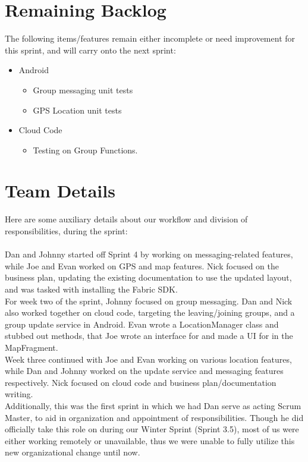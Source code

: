 \documentclass[11pt]{article}
\begin{document}
\section*{Remaining Backlog}
The following items/features remain either incomplete or need improvement for this sprint, and will carry onto the next sprint:
	\begin{itemize}
		\item Android
		\begin{itemize}
			\item Group messaging unit tests
			\item GPS Location unit tests
		\end{itemize}
		\item Cloud Code
		\begin{itemize}
			\item Testing on Group Functions.
		\end{itemize}
	\end{itemize}


	
\section*{Team Details}
Here are some auxiliary details about our workflow and division of responsibilities, during the sprint: \\\\

Dan and Johnny started off Sprint 4 by working on messaging-related features, while Joe and Evan worked on GPS and map features. Nick focused on the business plan, updating the existing documentation to use the updated layout, and was tasked with installing the Fabric SDK.\\

For week two of the sprint, Johnny focused on group messaging. Dan and Nick also worked together on cloud code, targeting the leaving/joining groups, and a group update service in Android. Evan wrote a LocationManager class and stubbed out methods, that Joe wrote an interface for and made a UI for in the MapFragment.\\

Week three continued with Joe and Evan working on various location features, while Dan and Johnny worked on the update service and messaging features respectively. Nick focused on cloud code and business plan/documentation writing.\\

Additionally, this was the first sprint in which we had Dan serve as acting Scrum Master, to aid in organization and appointment of responsibilities. Though he did officially take this role on during our Winter Sprint (Sprint 3.5), most of us were either working remotely or unavailable, thus we were unable to fully utilize this new organizational change until now.
\end{document}
